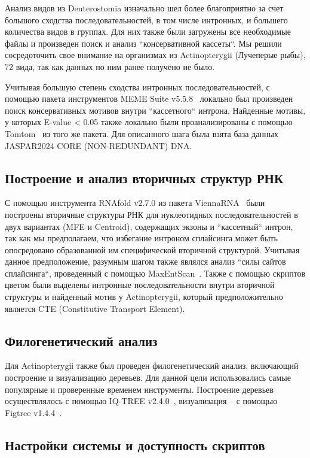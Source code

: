 Анализ видов из Deuterostomia изначально шел более благоприятно за счет большого сходства последовательностей, в том числе интронных, и большего количества видов в группах.
Для них также были загружены все необходимые файлы и произведен поиск и анализ ``консервативной кассеты``.
Мы решили сосредоточить свое внимание на организмах из Actinopterygii (Лучеперые рыбы), 72 вида, так как данных по ним ранее получено не было.

Учитывая большую степень сходства интронных последовательностей, с помощью пакета инструментов MEME Suite v5.5.8~\cite{meme} локально был произведен поиск консервативных мотивов внутри ``кассетного`` интрона.
Найденные мотивы, у которых E-value < 0.05 также локально были проанализированы с помощью Tomtom~\cite{tomtom} из того же пакета.
Для описанного шага была взята база данных JASPAR2024 CORE (NON-REDUNDANT) DNA.

\subsection{Построение и анализ вторичных структур РНК}

С помощью инструмента RNAfold v2.7.0 из пакета Vienna\-RNA~\cite{viennarna} были построены вторичные структуры РНК для нуклеотидных последовательностей в двух вариантах (MFE и Centroid), содержащих экзоны и ``кассетный`` интрон, так как мы предполагаем, что избегание интроном сплайсинга может быть опосредовано образованной им специфической вторичной структурой.
Учитывая данное предположение, разумным шагом также являлся анализ ``силы сайтов сплайсинга``, проведенный с помощью MaxEntScan~\cite{maxentsccan}.
Также с помощью скриптов цветом были выделены интронные последовательности внутри вторичной структуры и найденный мотив у Actinopterygii, который предположительно является CTE (Constitutive Transport Element).

\subsection{Филогенетический анализ}

Для Actinopterygii также был проведен филогенетический анализ, включающий построение и визуализацию деревьев.
Для данной цели использовались самые популярные и проверенные временем инструменты.
Построение деревьев осуществлялось с помощью IQ-TREE v2.4.0~\cite{iqtree2}, визуализация – с помощью Figtree v1.4.4~\cite{figtree}.

\subsection{Настройки системы и доступность скриптов}

